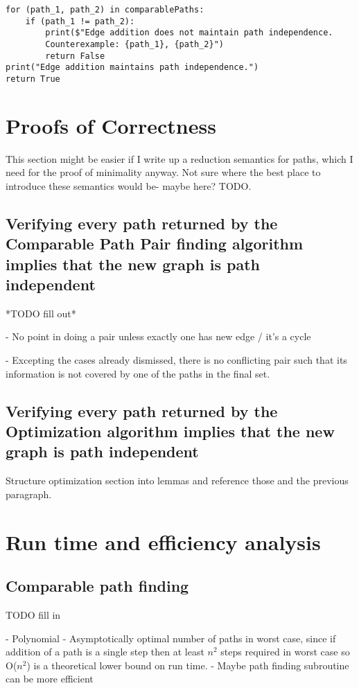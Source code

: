 \documentclass{article}
\begin{document}
\begin{verbatim}
for (path_1, path_2) in comparablePaths:
    if (path_1 != path_2):
        print($"Edge addition does not maintain path independence. 
        Counterexample: {path_1}, {path_2}")
        return False
print("Edge addition maintains path independence.")
return True
\end{verbatim}

\section{Proofs of Correctness}
This section might be easier if I write up a reduction semantics for paths, which I need for the proof of minimality anyway. Not sure where the best place to introduce these semantics would be- maybe here? TODO.

\subsection{Verifying every path returned by the Comparable Path Pair finding algorithm implies that the new graph is path independent}
*TODO fill out*

- No point in doing a pair unless exactly one has new edge / it's a cycle

- Excepting the cases already dismissed, there is no conflicting pair such that its information is not covered by one of the paths in the final set.

\subsection{Verifying every path returned by the Optimization algorithm implies that the new graph is path independent}
Structure optimization section into lemmas and reference those and the previous paragraph.

\section{Run time and efficiency analysis}

\subsection{Comparable path finding}
TODO fill in

- Polynomial
- Asymptotically optimal number of paths in worst case, since if addition of a path is a single step then at least $n^2$ steps required in worst case so O($n^2$) is a theoretical lower bound on run time.
- Maybe path finding subroutine can be more efficient
\end{document}
